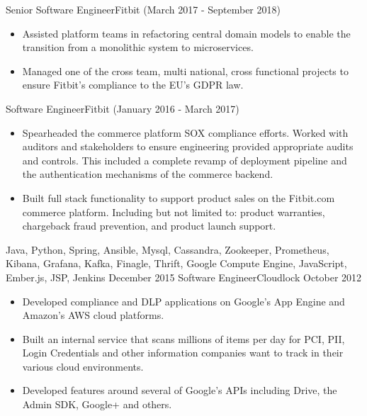 \begin{experiences}
{                  }
                  {}
  \experience
  {}  {Senior Software Engineer}{Fitbit {\footnotesize (March 2017 - September 2018)}}
  {}   {
                      \begin{itemize}
                        \item Assisted platform teams in refactoring central domain models to enable the transition from a monolithic system to microservices.
                        \item Managed one of the cross team, multi national, cross functional projects to ensure Fitbit’s compliance to the EU’s GDPR law.
                      \end{itemize}
                  }
                  {}
   \experience
  {}  {Software Engineer}{Fitbit {\footnotesize (January 2016 - March 2017)}}
  {}   {
                      \begin{itemize}
                        \item Spearheaded the commerce platform SOX compliance efforts. Worked with auditors and stakeholders to ensure engineering provided appropriate audits and controls. This included a complete revamp of deployment pipeline and the authentication mechanisms of the commerce backend.
                        \item Built full stack functionality to support product sales on the Fitbit.com commerce platform. Including but not limited to: product warranties, chargeback fraud prevention, and product launch support.
                      \end{itemize}
                  }
                  {Java, Python, Spring, Ansible, Mysql, Cassandra, Zookeeper, Prometheus, Kibana, Grafana, Kafka, Finagle, Thrift, Google Compute Engine, JavaScript, Ember.js, JSP, Jenkins}
\emptySeparator
  \experience
  {December 2015}  {Software Engineer}{Cloudlock}
  {October 2012}   {
                      \begin{itemize}
                        \item Developed compliance and DLP applications on Google's App Engine and Amazon's AWS cloud platforms.
                        \item Built an internal service that scans millions of items per day for PCI, PII, Login Credentials and other information companies want to track in their various cloud environments.
                        \item Developed features around several of Google's APIs including Drive, the Admin SDK, Google+ and others.
                      \end{itemize}
}
\end{experiences}

